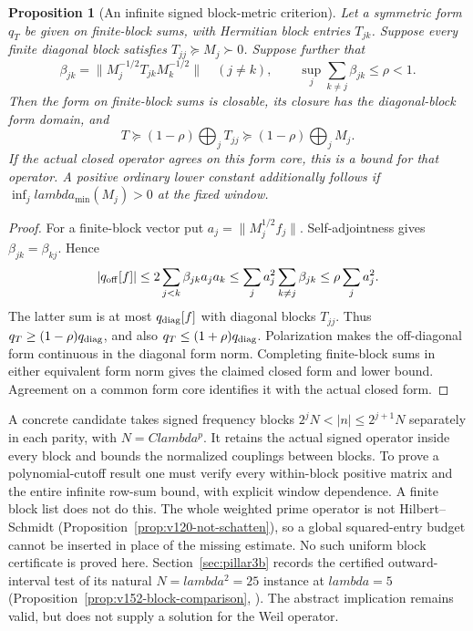 \documentclass[11pt]{article}
\def\lambda{lambda}%
\newtheorem{proposition}[theorem]{Proposition}
\theoremstyle{remark}
\begin{document}
\begin{proposition}[An infinite signed block-metric criterion]
\label{prop:v127-block-metric}
Let a symmetric form $q_T$ be given on finite-block sums,
with Hermitian block entries $T_{jk}$. Suppose every finite diagonal
block satisfies $T_{jj}\succeq M_j\succ0$. Suppose further that
\[
 \beta_{jk}=\|M_j^{-1/2}T_{jk}M_k^{-1/2}\|\quad(j\ne k),\qquad
 \sup_j\sum_{k\ne j}\beta_{jk}\le\rho<1.
\]
Then the form on finite-block sums is closable, its closure has the
diagonal-block form domain, and
\[
 T\succeq(1-\rho)\bigoplus_jT_{jj}
   \succeq(1-\rho)\bigoplus_jM_j.
\]
If the actual closed operator agrees on this form core, this is a
bound for that operator. A positive ordinary lower constant additionally
follows if $\inf_j\lambda_{\min}(M_j)>0$ at the fixed window.
\end{proposition}
\begin{proof}
For a finite-block vector put $a_j=\|M_j^{1/2}f_j\|$.
Self-adjointness gives $\beta_{jk}=\beta_{kj}$. Hence
\[
 |q_{\rm off}[f]|\le2\sum_{j<k}\beta_{jk}a_ja_k
 \le\sum_j a_j^2\sum_{k\ne j}\beta_{jk}
 \le\rho\sum_j a_j^2.
\]
The latter sum is at most $q_{\rm diag}[f]$ with diagonal blocks
$T_{jj}$. Thus $q_T\ge(1-\rho)q_{\rm diag}$, and also
$q_T\le(1+\rho)q_{\rm diag}$. Polarization makes the off-diagonal
form continuous in the diagonal form norm. Completing finite-block
sums in either equivalent form norm gives the claimed closed form
and lower bound. Agreement on a common form core identifies it with
the actual closed form.
\end{proof}

A concrete candidate takes signed frequency blocks
$2^jN<|n|\le2^{j+1}N$ separately in each parity, with
$N=C\lambda^p$. It retains the actual signed operator inside every
block and bounds the normalized couplings between blocks. To prove
a polynomial-cutoff result one must verify every within-block positive
matrix and the entire infinite row-sum bound, with explicit window
dependence. A finite block list does not do this. The whole weighted
prime operator is not Hilbert--Schmidt
(Proposition~\ref{prop:v120-not-schatten}), so a global squared-entry
budget cannot be inserted in place of the missing estimate.
No such uniform block certificate is proved here. Section~\ref{sec:pillar3b} records the certified outward-interval test of its natural $N=\lambda^2=25$ instance at
$\lambda=5$ (Proposition~\ref{prop:v152-block-comparison}, ). The abstract implication remains
valid, but does not supply a solution for the Weil operator.
\end{document}
